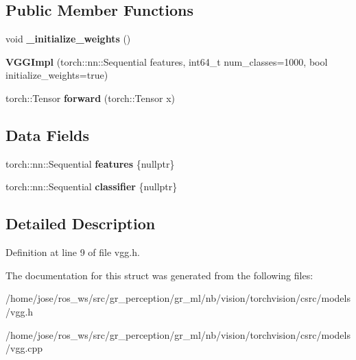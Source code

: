 \subsection*{Public Member Functions}
\begin{DoxyCompactItemize}
\item 
\mbox{\label{structvision_1_1models_1_1VGGImpl_a943c703df15575e9653b51c245189381}} 
void {\bfseries \+\_\+initialize\+\_\+weights} ()
\item 
\mbox{\label{structvision_1_1models_1_1VGGImpl_adc65b06718d7c7b4b1dde6ddf58d53d2}} 
{\bfseries V\+G\+G\+Impl} (torch\+::nn\+::\+Sequential features, int64\+\_\+t num\+\_\+classes=1000, bool initialize\+\_\+weights=true)
\item 
\mbox{\label{structvision_1_1models_1_1VGGImpl_ad6027cdb072608193d947b805c46e0ae}} 
torch\+::\+Tensor {\bfseries forward} (torch\+::\+Tensor x)
\end{DoxyCompactItemize}
\subsection*{Data Fields}
\begin{DoxyCompactItemize}
\item 
\mbox{\label{structvision_1_1models_1_1VGGImpl_ad3b6bdd08094d1464a023a10e90961b1}} 
torch\+::nn\+::\+Sequential {\bfseries features} \{nullptr\}
\item 
\mbox{\label{structvision_1_1models_1_1VGGImpl_a4fb457e5f55e47b5438ef53c5ecd2e79}} 
torch\+::nn\+::\+Sequential {\bfseries classifier} \{nullptr\}
\end{DoxyCompactItemize}


\subsection{Detailed Description}


Definition at line 9 of file vgg.\+h.



The documentation for this struct was generated from the following files\+:\begin{DoxyCompactItemize}
\item 
/home/jose/ros\+\_\+ws/src/gr\+\_\+perception/gr\+\_\+ml/nb/vision/torchvision/csrc/models/vgg.\+h\item 
/home/jose/ros\+\_\+ws/src/gr\+\_\+perception/gr\+\_\+ml/nb/vision/torchvision/csrc/models/vgg.\+cpp\end{DoxyCompactItemize}
